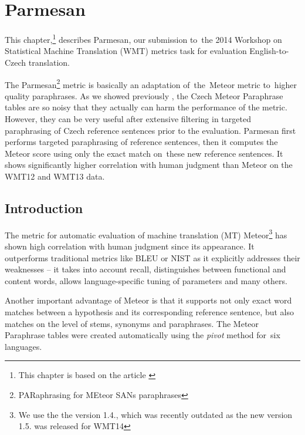 \chapter{Parmesan}
\label{parmesan}

This chapter,\footnote{This chapter is based on the article \citep{parmesan:2014}}  describes Parmesan, our submission to~the 2014 Workshop on Statistical
Machine Translation (WMT) metrics task for evaluation English-to-Czech translation. 

The Parmesan\footnote{PARaphrasing for MEteor SANs paraphrases} metric is basically an adaptation of~the~Meteor metric to~higher quality paraphrases.
As we showed previously , the Czech Meteor Paraphrase tables are so noisy that they actually can harm the performance of the metric. 
However, they can be very useful after extensive filtering in targeted paraphrasing of Czech reference sentences prior to the evaluation.
Parmesan first performs targeted paraphrasing of reference sentences, then it computes the Meteor score using only the exact match on~these new reference sentences. 
It shows significantly higher correlation with human judgment than Meteor on the WMT12 and WMT13 data. 

\section{Introduction}

The metric for automatic evaluation of machine translation (MT) Meteor\footnote{We use the 
the version 1.4., which was recently outdated as the new version 1.5. was released for WMT14} 
\cite{meteor-wmt:2011} has shown high correlation with human judgment since its appearance. It 
outperforms traditional metrics like BLEU \cite{bleu} or NIST \cite{nist} as it explicitly addresses 
their weaknesses -- it takes into account recall, distinguishes between functional and content words, 
allows language-specific tuning of parameters and many others.

Another important advantage of Meteor is that it supports not only exact word matches between a 
hypothesis and its corresponding reference sentence, but also matches on the level of stems,
synonyms and paraphrases. The Meteor Paraphrase tables \cite{meteor-tables} were created
automatically using the \textit{pivot} method \cite{pivoting} for~six languages.

